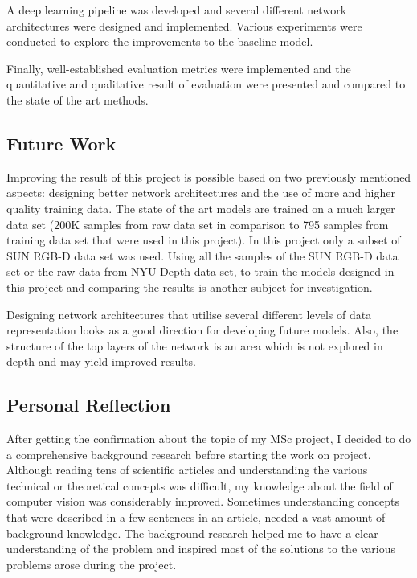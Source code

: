 A deep learning pipeline was developed and several different network architectures were designed and implemented. Various experiments were conducted to explore the improvements to the baseline model. 

Finally, well-established evaluation metrics were implemented and the quantitative and qualitative result of evaluation were presented and compared to the state of the art methods.  

\subsection{Future Work}

Improving the result of this project is possible based on two previously mentioned aspects: designing better network architectures and the use of more and higher quality training data. The state of the art models are trained on a much larger data set (200K samples from raw data set in comparison to 795 samples from training data set that were used in this project). In this project only a subset of SUN RGB-D data set was used. Using all the samples of the SUN RGB-D data set or the raw data from NYU Depth data set, to train the models designed in this project and comparing the results is another subject for investigation.

Designing network architectures that utilise several different levels of data representation looks as a good direction for developing future models. Also, the structure of the top layers of the network is an area which is not explored in depth and may yield improved results. 

\subsection{Personal Reflection}

After getting the confirmation about the topic of my MSc project, I decided to do a comprehensive background research before starting the work on project. Although reading tens of scientific articles and understanding the various technical or theoretical concepts was difficult, my knowledge about the field of computer vision was considerably improved. Sometimes understanding concepts that were described in a few sentences in an article, needed a vast amount of background knowledge. The background research helped me to have a clear understanding of the problem and inspired most of the solutions to the various problems arose during the project.  

